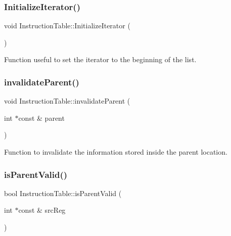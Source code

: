 \subsubsection{\texorpdfstring{Initialize\+Iterator()}{InitializeIterator()}}
{\footnotesize\ttfamily void Instruction\+Table\+::\+Initialize\+Iterator (\begin{DoxyParamCaption}{ }\end{DoxyParamCaption})}



Function useful to set the iterator to the beginning of the list. 

\mbox{\label{classoctantis_1_1InstructionTable_add6088740c6b85cc51145cc452382339}} 
\subsubsection{\texorpdfstring{invalidate\+Parent()}{invalidateParent()}}
{\footnotesize\ttfamily void Instruction\+Table\+::invalidate\+Parent (\begin{DoxyParamCaption}\item[{int $\ast$const \&}]{parent }\end{DoxyParamCaption})}



Function to invalidate the information stored inside the parent location. 

\mbox{\label{classoctantis_1_1InstructionTable_aa23ec2def1ff2cd76a79a252944c9b27}} 
\subsubsection{\texorpdfstring{is\+Parent\+Valid()}{isParentValid()}}
{\footnotesize\ttfamily bool Instruction\+Table\+::is\+Parent\+Valid (\begin{DoxyParamCaption}\item[{int $\ast$const \&}]{src\+Reg }\end{DoxyParamCaption})}

